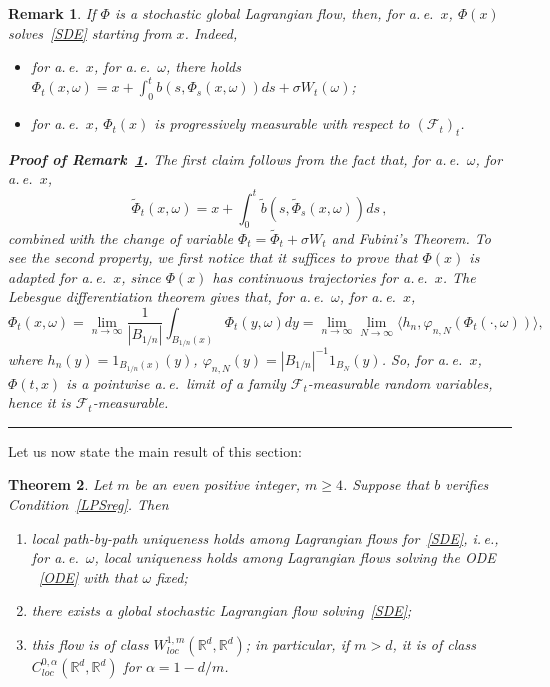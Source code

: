 \documentclass[a4paper,10pt]{article}
\newtheorem{theorem}{Theorem}
\newtheorem{remark}[theorem]{Remark}
\newenvironment{proof}[1][Proof]{\noindent\textbf{#1.} }{\ \rule{0.5em}{0.5em}}
\newcommand{\mr}{\mathbb{R}}
\newcommand{\mc}{\mathcal}
\newcommand{\lan}{\langle}
\newcommand{\ran}{\rangle}
\newcommand{\td}{\tilde}
\begin{document}
\begin{remark}\label{progrmeas}
If $\Phi$ is a stochastic global Lagrangian flow, then, for a.\,e.\ $x$, $\Phi(x)$ solves~\eqref{SDE} starting from $x$. Indeed,
\begin{itemize}
  \item for a.\,e.\ $x$, for a.\,e.\ $\omega$, there holds $\Phi_t(x,\omega)=x+\int^t_0b(s,\Phi_s(x,\omega))ds+\sigma W_t(\omega)$;
  \item for a.\,e.\ $x$, $\Phi_t(x)$ is progressively measurable with respect to $(\mc{F}_t)_t$.
\end{itemize}

\begin{proof}[Proof of Remark~\ref{progrmeas}]
The first claim follows from the fact that, for a.\,e.\ $\omega$, for a.\,e.\ $x$,
\begin{equation*}
\td{\Phi}_t(x,\omega)=x+\int^t_0\td{b}(s,\td{\Phi}_s(x,\omega))ds \,,
\end{equation*}
combined with the change of variable $\Phi_t=\td{\Phi}_t+\sigma W_t$ and Fubini's Theorem. To see the second property, we first notice that it suffices to prove that $\Phi(x)$ is adapted for a.\,e.\ $x$, since $\Phi(x)$ has continuous trajectories for a.\,e.\ $x$. The Lebesgue differentiation theorem gives that, for a.\,e.\ $\omega$, for a.\,e.\ $x$,
\begin{equation*}
\Phi_t(x,\omega)=\lim_{n \to \infty} \frac{1}{|B_{1/n}|}\int_{B_{1/n}(x)}\Phi_t(y,\omega)dy=\lim_{n \to \infty} \lim_{N \to \infty} \lan h_n,\varphi_{n,N}(\Phi_t(\cdot,\omega))\ran,
\end{equation*}
where $h_n(y)=1_{B_{1/n}(x)}(y)$, $\varphi_{n,N}(y)=|B_{1/n}|^{-1} 1_{B_N}(y)$. So, for a.\,e.\ $x$, $\Phi(t,x)$ is a pointwise a.\,e.\ limit of a family $\mc{F}_t$-measurable random variables, hence it is $\mc{F}_t$-measurable.
\end{proof}
\end{remark}

Let us now state the main result of this section:

\begin{theorem}\label{main thm flows}
Let $m$ be an even positive integer, $m\ge4$. Suppose that $b$ verifies Condition~\ref{LPSreg}. Then
\begin{enumerate}
\item local path-by-path uniqueness holds among Lagrangian flows for~\eqref{SDE}, i.\,e., for a.\,e.\ $\omega$, local uniqueness holds among Lagrangian flows solving the ODE ~\eqref{ODE} with that $\omega$ fixed;
\item there exists a global stochastic Lagrangian flow solving~\eqref{SDE};
\item this flow is of class $W^{1,m}_{loc}(\mr^d,\mr^d)$; in particular, if $m>d$, it is of class $C^{0,\alpha}_{loc}(\mr^d,\mr^d)$ for $\alpha=1-d/m$.
\end{enumerate}
\end{theorem}
\end{document}

